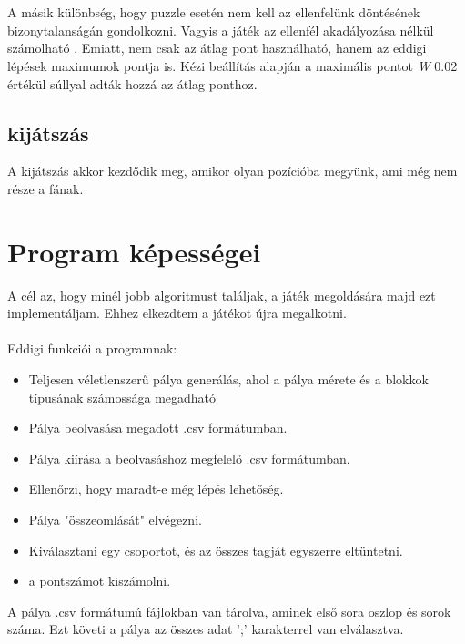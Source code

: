 \documentclass{article}
\begin{document}
	\\
	\\
	A másik különbség, hogy puzzle esetén nem kell az ellenfelünk döntésének bizonytalanságán gondolkozni. Vagyis a játék az ellenfél akadályozása nélkül számolható \cite{chaslot2010monte}. Emiatt, nem csak az átlag pont használható, hanem az eddigi lépések maximumok pontja is. Kézi beállítás alapján a maximális pontot \emph{W} 0.02 értékül súllyal adták hozzá az átlag ponthoz.\cite{schadd2012single}
	\\
	\subsection{kijátszás}
	
	A kijátszás akkor kezdődik meg, amikor olyan pozícióba megyünk, ami még nem része a fának. 
	
	
	\section{Program képességei}
	
	A cél az, hogy minél jobb algoritmust találjak, a játék megoldására majd ezt implementáljam. Ehhez elkezdtem a játékot újra megalkotni.
	\\
	\\	
			
	Eddigi funkciói a programnak:
	\begin{itemize}
		\item Teljesen véletlenszerű pálya generálás, ahol a pálya mérete és a blokkok típusának számossága megadható
		\item Pálya beolvasása megadott .csv formátumban.
		\item Pálya kiírása a beolvasáshoz megfelelő .csv formátumban.
		\item Ellenőrzi, hogy maradt-e még lépés lehetőség.
		\item Pálya "összeomlását" elvégezni.
		\item  Kiválasztani egy csoportot, és az összes tagját egyszerre eltüntetni.
		\item a pontszámot kiszámolni.
	\end{itemize}
	
	A pálya .csv formátumú fájlokban van tárolva, aminek első sora oszlop és sorok száma. Ezt követi a pálya az összes adat ';' karakterrel van elválasztva.
		
	
	
	
\end{document}
